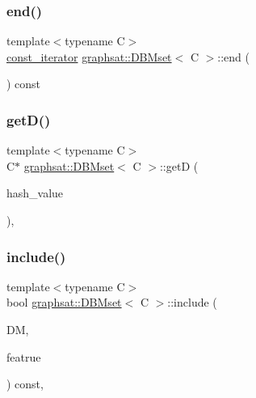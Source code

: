 \mbox{\label{classgraphsat_1_1_d_b_mset_a036eed51ffdf1f6b4587d5f4138a7b87}} 
\subsubsection{\texorpdfstring{end()}{end()}\hspace{0.1cm}{\footnotesize\ttfamily [2/2]}}
{\footnotesize\ttfamily template$<$typename C$>$ \\
\mbox{\hyperlink{classgraphsat_1_1_d_b_mset_1_1const__iterator}{const\+\_\+iterator}} \mbox{\hyperlink{classgraphsat_1_1_d_b_mset}{graphsat\+::\+D\+B\+Mset}}$<$ C $>$\+::end (\begin{DoxyParamCaption}{ }\end{DoxyParamCaption}) const\hspace{0.3cm}{\ttfamily [inline]}}

\mbox{\label{classgraphsat_1_1_d_b_mset_ae552a8fb83cb9a08013367be5134aa1d}} 
\subsubsection{\texorpdfstring{getD()}{getD()}}
{\footnotesize\ttfamily template$<$typename C$>$ \\
C$\ast$ \mbox{\hyperlink{classgraphsat_1_1_d_b_mset}{graphsat\+::\+D\+B\+Mset}}$<$ C $>$\+::getD (\begin{DoxyParamCaption}\item[{uint32\+\_\+t}]{hash\+\_\+value }\end{DoxyParamCaption})\hspace{0.3cm}{\ttfamily [inline]}, {\ttfamily [private]}}

\mbox{\label{classgraphsat_1_1_d_b_mset_a2b49bd304c445eb02b1a544900765d70}} 
\subsubsection{\texorpdfstring{include()}{include()}}
{\footnotesize\ttfamily template$<$typename C$>$ \\
bool \mbox{\hyperlink{classgraphsat_1_1_d_b_mset}{graphsat\+::\+D\+B\+Mset}}$<$ C $>$\+::include (\begin{DoxyParamCaption}\item[{const C $\ast$const}]{DM,  }\item[{\mbox{\hyperlink{namespacegraphsat_a9d75165dd4e82d2e03ffd07fe27533d0}{D\+F\+\_\+T}} \&}]{featrue }\end{DoxyParamCaption}) const\hspace{0.3cm}{\ttfamily [inline]}, {\ttfamily [private]}}

